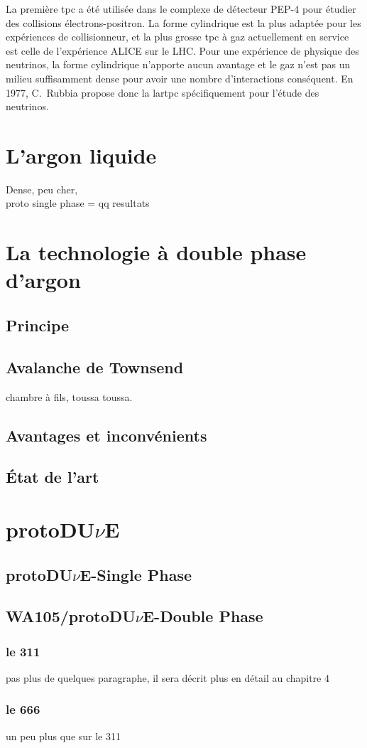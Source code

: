     La première \gls{tpc} a été utilisée dans le complexe de détecteur PEP-4 pour étudier des collisions électrons-positron. La forme cylindrique est la plus adaptée pour les expériences de collisionneur, et la plus grosse \gls{tpc} à gaz actuellement en service est celle de l'expérience ALICE sur le LHC. Pour une expérience de physique des neutrinos, la forme cylindrique n'apporte aucun avantage et le gaz n'est pas un milieu suffisamment dense pour avoir une nombre d'interactions conséquent. En 1977, C.~Rubbia propose donc la \acrfull{lartpc} \cite{Rubbia1977} spécifiquement pour l'étude des neutrinos.
    
  \section{L'argon liquide}\label{sec::lartpc}
      Dense, peu cher, \\
      proto single phase = qq resultats
    
  \section{La technologie à double phase d'argon}
    \subsection{Principe}
    \subsection{Avalanche de Townsend}
      chambre à fils, toussa toussa.
    \subsection{Avantages et inconvénients}
    \subsection{État de l'art}
    
  \section{\texorpdfstring{protoDU$\nu$E}{protoDUNE}}
    \subsection{\texorpdfstring{protoDU$\nu$E}{protoDUNE}-Single Phase}
    \subsection{WA105/\texorpdfstring{protoDU$\nu$E}{protoDUNE}-Double Phase}
      \subsubsection{le 311}
        pas plus de quelques paragraphe, il sera décrit plus en détail au chapitre 4
      \subsubsection{le 666}
        un peu plus que sur le 311
